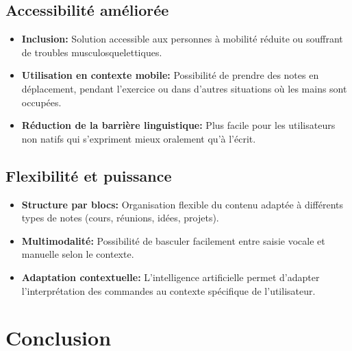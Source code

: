 \subsection{Accessibilité améliorée}

\begin{itemize}
    \item \textbf{Inclusion:} Solution accessible aux personnes à mobilité réduite ou souffrant de troubles musculosquelettiques.
    
    \item \textbf{Utilisation en contexte mobile:} Possibilité de prendre des notes en déplacement, pendant l'exercice ou dans d'autres situations où les mains sont occupées.
    
    \item \textbf{Réduction de la barrière linguistique:} Plus facile pour les utilisateurs non natifs qui s'expriment mieux oralement qu'à l'écrit.
\end{itemize}

\subsection{Flexibilité et puissance}

\begin{itemize}
    \item \textbf{Structure par blocs:} Organisation flexible du contenu adaptée à différents types de notes (cours, réunions, idées, projets).
    
    \item \textbf{Multimodalité:} Possibilité de basculer facilement entre saisie vocale et manuelle selon le contexte.
    
    \item \textbf{Adaptation contextuelle:} L'intelligence artificielle permet d'adapter l'interprétation des commandes au contexte spécifique de l'utilisateur.
\end{itemize}


\section{Conclusion}

